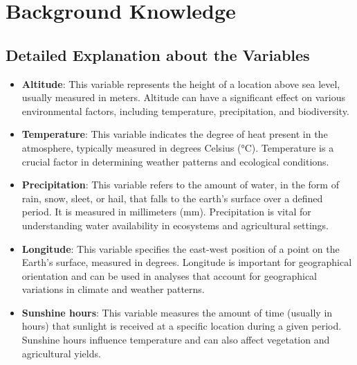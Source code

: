 \documentclass{article}
\begin{document}
\section{Background Knowledge}
\subsection{Detailed Explanation about the Variables}
\begin{itemize}
\item \textbf{Altitude}: This variable represents the height of a location above sea level, usually measured in meters. Altitude can have a significant effect on various environmental factors, including temperature, precipitation, and biodiversity.
\item \textbf{Temperature}: This variable indicates the degree of heat present in the atmosphere, typically measured in degrees Celsius (°C). Temperature is a crucial factor in determining weather patterns and ecological conditions.
\item \textbf{Precipitation}: This variable refers to the amount of water, in the form of rain, snow, sleet, or hail, that falls to the earth's surface over a defined period. It is measured in millimeters (mm). Precipitation is vital for understanding water availability in ecosystems and agricultural settings.
\item \textbf{Longitude}: This variable specifies the east-west position of a point on the Earth's surface, measured in degrees. Longitude is important for geographical orientation and can be used in analyses that account for geographical variations in climate and weather patterns.
\item \textbf{Sunshine hours}: This variable measures the amount of time (usually in hours) that sunlight is received at a specific location during a given period. Sunshine hours influence temperature and can also affect vegetation and agricultural yields.
\end{itemize}
\end{document}
